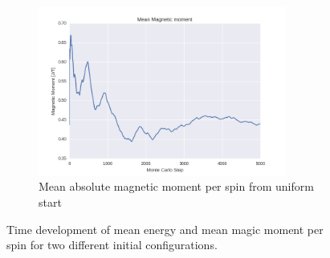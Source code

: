 \documentclass[a4paper, 10pt]{article}
\begin{document}
\begin{figure}[!ht]
    ~ 
    \begin{subfigure}[H!]{0.5\textwidth}
        \centering
        \includegraphics[height=2.2in]{meanMagMomWUpStartT24.png}
        \caption{Mean absolute magnetic moment per spin from uniform start}
    \end{subfigure}
      \caption{Time development of mean energy and mean magic moment per spin for two different initial configurations.}\label{fig:20x20_Sweep_T_24}
\end{figure}
\end{document}
